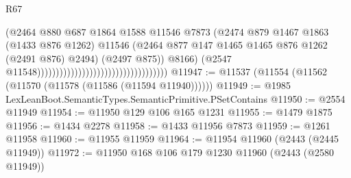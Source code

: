 \begin{lexlean}{R67}
\begin{coremodule}
                                                                        (@2464
                                                                          @880
                                                                          @687
                                                                          @1864
                                                                          @1588
                                                                          @11546
                                                                          @7873
                                                                          (@2474
                                                                            @879
                                                                            @1467
                                                                            @1863
                                                                            (@1433 @876 @1262)
                                                                            @11546
                                                                            (@2464
                                                                              @877
                                                                              @147
                                                                              @1465
                                                                              @1465
                                                                              @876
                                                                              @1262
                                                                              (@2491 @876)
                                                                              @2494)
                                                                            (@2497 @875))
                                                                          @8166)
                                                                        (@2547
                                                                          @11548)))))))))))))))))))))))))))))))))))
@11947 := @11537 (@11554 (@11562 (@11570 (@11578 (@11586 (@11594 @11940))))))
@11949 := @1985 LexLeanBoot.SemanticTypes.SemanticPrimitive.PSetContains
@11950 := @2554 @11949
@11954 := @11950 @129 @106 @165 @1231
@11955 := @1479 @1875
@11956 := @1434 @2278
@11958 := @1433 @11956 @7873
@11959 := @1261 @11958
@11960 := @11955 @11959
@11964 := @11954 @11960 (@2443 (@2445 @11949))
@11972 := @11950 @168 @106 @179 @1230 @11960 (@2443 (@2580 @11949))

\end{coremodule}
\end{lexlean}
